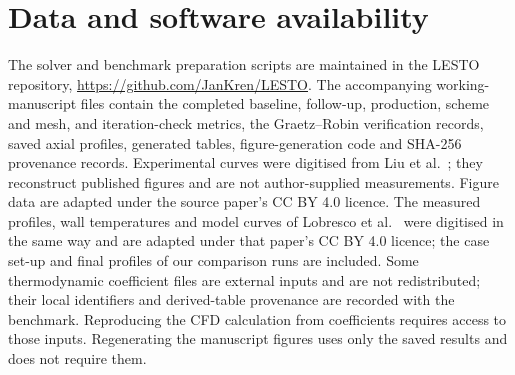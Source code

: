 \documentclass{article}
\begin{document}
\section*{Data and software availability}
The solver and benchmark preparation scripts are maintained in the
LESTO repository, \url{https://github.com/JanKren/LESTO}. The accompanying
working-manuscript files contain the completed baseline, follow-up,
production, scheme and mesh, and iteration-check metrics, the
Graetz--Robin verification records, saved axial profiles, generated tables, figure-generation code
and SHA-256 provenance records. Experimental curves were digitised from
Liu et al.\ \cite{Liu2025chemical}; they reconstruct published figures
and are not author-supplied measurements. Figure data are adapted under
the source paper's CC BY 4.0 licence. The measured profiles, wall
temperatures and model curves of Lobresco et al.\
\cite{Lobresco2026assessment} were digitised in the same way and are
adapted under that paper's CC BY 4.0 licence; the case set-up and final
profiles of our comparison runs are included. Some thermodynamic coefficient
files are external inputs and are not redistributed; their local
identifiers and derived-table provenance are recorded with the
benchmark. Reproducing the CFD calculation from coefficients requires
access to those inputs. Regenerating the manuscript figures uses only
the saved results and does not require them.

\begingroup
\small

\endgroup
\end{document}

